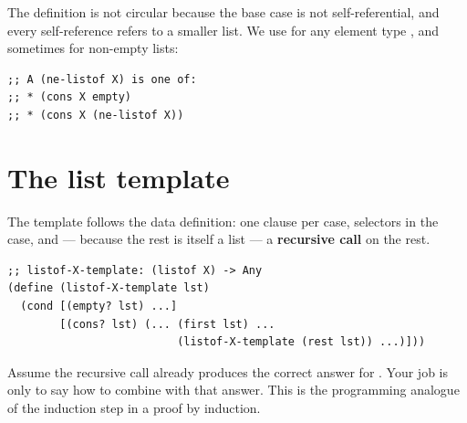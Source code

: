 \begin{center}
\end{center}

The definition is not circular because the base case  is not
self-referential, and every self-reference refers to a smaller list. We use
 for any element type , and sometimes
 for non-empty lists:

\begin{lstlisting}[style=racket]
;; A (ne-listof X) is one of:
;; * (cons X empty)
;; * (cons X (ne-listof X))
\end{lstlisting}

\section{The list template}

The template follows the data definition: one  clause per case,
selectors in the  case, and --- because the rest is itself a list
--- a \textbf{recursive call} on the rest.

\begin{lstlisting}[style=racket]
;; listof-X-template: (listof X) -> Any
(define (listof-X-template lst)
  (cond [(empty? lst) ...]
        [(cons? lst) (... (first lst) ...
                          (listof-X-template (rest lst)) ...)]))
\end{lstlisting}

\begin{important}
Assume the recursive call already produces the correct answer for
. Your job is only to say how to combine 
with that answer. This is the programming analogue of the induction step in
a proof by induction.
\end{important}

